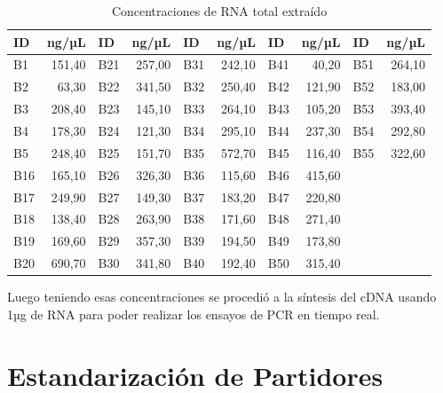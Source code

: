 \documentclass[12pt,letterpaper,oneside]{scrbook}
\begin{document}
\begin{table}[h!]
    \begin{center}
        \begin{threeparttable}
            \caption{Concentraciones de RNA total extraído}\label{tablaRNA}
            \begin{tabular}{l r l r l r l r l r}
                \toprule
                \textbf{ID}   & \textbf{ng/µL} & \textbf{ID} & \textbf{ng/µL} & \textbf{ID} & \textbf{ng/µL} & \textbf{ID} & \textbf{ng/µL} & \textbf{ID} & \textbf{ng/µL}\\
                \midrule
                B1    & 151,40 & B21 & 257,00 & B31 & 242,10 & B41 & 40,20 & B51 & 264,10 \\
                B2 & 63,30 & B22 & 341,50 & B32 & 250,40 & B42 & 121,90 & B52 & 183,00 \\
                B3 & 208,40 & B23 & 145,10 & B33 & 264,10 & B43 & 105,20 & B53 & 393,40 \\
                B4 & 178,30 & B24 & 121,30 & B34 & 295,10 & B44 & 237,30 & B54 & 292,80 \\
                B5 & 248,40 & B25 & 151,70 & B35 & 572,70 & B45 & 116,40 & B55 & 322,60 \\
                B16 & 165,10 & B26 & 326,30 & B36 & 115,60 & B46 & 415,60 & \\
                B17 & 249,90 & B27 & 149,30 & B37 & 183,20 & B47 & 220,80 & \\
                B18 & 138,40 & B28 & 263,90 & B38 & 171,60 & B48 & 271,40 & \\
                B19 & 169,60 & B29 & 357,30 & B39 & 194,50 & B49 & 173,80 & \\
                B20 & 690,70 & B30 & 341,80 & B40 & 192,40 & B50 & 315,40 & \\
                \bottomrule
            \end{tabular}
        \end{threeparttable}
    \end{center}
\end{table}

Luego teniendo esas concentraciones se procedió a la síntesis del cDNA
usando 1µg de RNA para poder realizar los ensayos de PCR en tiempo real.

\section{Estandarización de Partidores}
\end{document}
